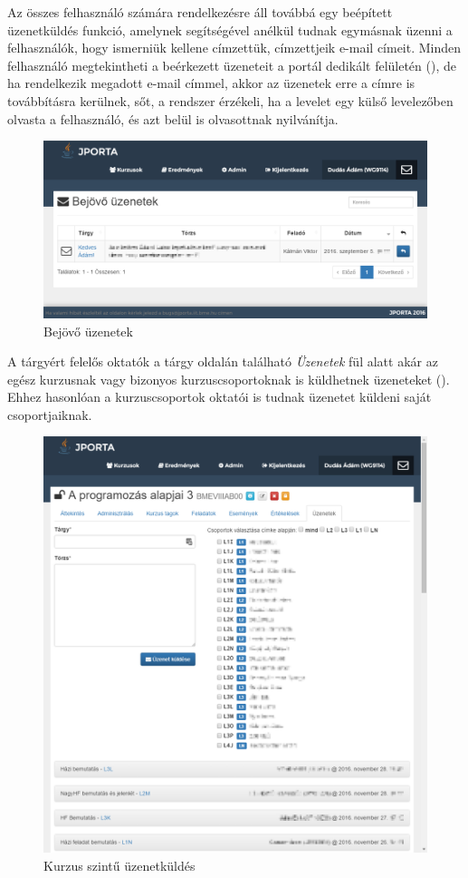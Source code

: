 Az összes felhasználó számára rendelkezésre áll továbbá egy beépített üzenetküldés funkció, amelynek segítségével anélkül tudnak egymásnak üzenni a felhasználók, hogy ismerniük kellene címzettük, címzettjeik e-mail címeit.
Minden felhasználó megtekintheti a beérkezett üzeneteit a portál dedikált felületén (), de ha rendelkezik megadott e-mail címmel, akkor az üzenetek erre a címre is továbbításra kerülnek, sőt, a rendszer érzékeli, ha a levelet egy külső levelezőben olvasta a felhasználó, és azt belül is olvasottnak nyilvánítja.
\begin{figure}[h]
    \centering
    \includegraphics[width=\textwidth]{figures/Jporta-inbox}
    \caption{Bejövő üzenetek}
    \label{figure:jporta-inbox}
\end{figure}
A tárgyért felelős oktatók a tárgy oldalán található \textit{Üzenetek} fül alatt akár az egész kurzusnak vagy bizonyos kurzuscsoportoknak is küldhetnek üzeneteket ().
Ehhez hasonlóan a kurzuscsoportok oktatói is tudnak üzenetet küldeni saját csoportjaiknak.
\begin{figure}[h]
    \centering
    \includegraphics[width=\textwidth]{figures/Jporta-course-messages}
    \caption{Kurzus szintű üzenetküldés}
    \label{figure:jporta-course-messages}
\end{figure}
